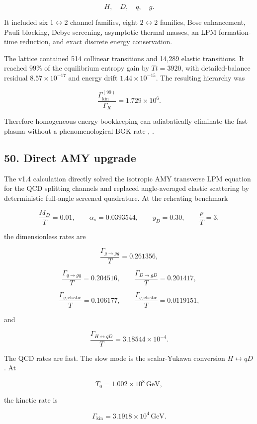 \documentclass[
]{article}
\begin{document}
\[
H,\quad D,\quad q,\quad g.
\]

It included six \(1\leftrightarrow2\) channel families, eight
\(2\leftrightarrow2\) families, Bose enhancement, Pauli blocking, Debye
screening, asymptotic thermal masses, an LPM formation-time reduction,
and exact discrete energy conservation.

The lattice contained 514 collinear transitions and 14,289 elastic
transitions. It reached \(99\%\) of the equilibrium entropy gain by
\(Tt=3920\), with detailed-balance residual \(8.57\times10^{-17}\) and
energy drift \(1.44\times10^{-15}\). The resulting hierarchy was

\[
\frac{\Gamma_{\mathrm{kin}}^{(99)}}{\Gamma_R}
=1.729\times10^6.
\]

Therefore homogeneous energy bookkeeping can adiabatically eliminate the
fast plasma without a phenomenological BGK rate
, .

\subsection{50. Direct AMY upgrade}\label{direct-amy-upgrade}

The v1.4 calculation directly solved the isotropic AMY transverse LPM
equation for the QCD splitting channels and replaced angle-averaged
elastic scattering by deterministic full-angle screened quadrature. At
the reheating benchmark

\[
\frac{M_D}{T}=0.01,
\qquad
\alpha_s=0.0393544,
\qquad
y_D=0.30,
\qquad
\frac pT=3,
\]

the dimensionless rates are

\[
\frac{\Gamma_{g\to gg}}T=0.261356,
\]

\[
\frac{\Gamma_{q\to gq}}T=0.204516,
\qquad
\frac{\Gamma_{D\to gD}}T=0.201417,
\]

\[
\frac{\Gamma_{g,\mathrm{elastic}}}T=0.106177,
\qquad
\frac{\Gamma_{q,\mathrm{elastic}}}T=0.0119151,
\]

and

\[
\boxed{
\frac{\Gamma_{H\leftrightarrow qD}}T
=3.18544\times10^{-4}.
}
\]

The QCD rates are fast. The slow mode is the scalar-Yukawa conversion
\(H\leftrightarrow qD\). At

\[
T_0=1.002\times10^8\,\mathrm{GeV},
\]

the kinetic rate is

\[
\Gamma_{\mathrm{kin}}=3.1918\times10^4\,\mathrm{GeV}.
\]
\end{document}

